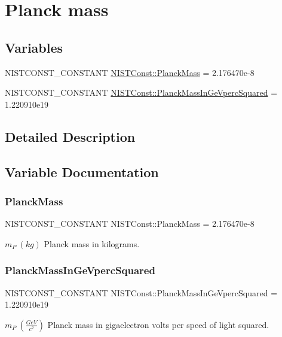 \hypertarget{group___n_i_s_t_const-_planck_mass}{}\section{Planck mass}
\label{group___n_i_s_t_const-_planck_mass}
\subsection*{Variables}
\begin{DoxyCompactItemize}
\item 
N\+I\+S\+T\+C\+O\+N\+S\+T\+\_\+\+C\+O\+N\+S\+T\+A\+NT \mbox{\hyperlink{group___n_i_s_t_const-_planck_mass_gaa7617a5b3ffb40b1ab6b80ae4017fe47}{N\+I\+S\+T\+Const\+::\+Planck\+Mass}} = 2.\+176470e-\/8
\item 
N\+I\+S\+T\+C\+O\+N\+S\+T\+\_\+\+C\+O\+N\+S\+T\+A\+NT \mbox{\hyperlink{group___n_i_s_t_const-_planck_mass_ga8d336f9833239f0cce753a1912e0a6df}{N\+I\+S\+T\+Const\+::\+Planck\+Mass\+In\+Ge\+Vperc\+Squared}} = 1.\+220910e19
\end{DoxyCompactItemize}


\subsection{Detailed Description}


\subsection{Variable Documentation}
\mbox{\label{group___n_i_s_t_const-_planck_mass_gaa7617a5b3ffb40b1ab6b80ae4017fe47}} 
\subsubsection{\texorpdfstring{Planck\+Mass}{PlanckMass}}
{\footnotesize\ttfamily N\+I\+S\+T\+C\+O\+N\+S\+T\+\_\+\+C\+O\+N\+S\+T\+A\+NT N\+I\+S\+T\+Const\+::\+Planck\+Mass = 2.\+176470e-\/8}

$m_P \ (kg)$ Planck mass in kilograms. \mbox{\label{group___n_i_s_t_const-_planck_mass_ga8d336f9833239f0cce753a1912e0a6df}} 
\subsubsection{\texorpdfstring{Planck\+Mass\+In\+Ge\+Vperc\+Squared}{PlanckMassInGeVpercSquared}}
{\footnotesize\ttfamily N\+I\+S\+T\+C\+O\+N\+S\+T\+\_\+\+C\+O\+N\+S\+T\+A\+NT N\+I\+S\+T\+Const\+::\+Planck\+Mass\+In\+Ge\+Vperc\+Squared = 1.\+220910e19}

$m_P \ (\frac{GeV}{c^2})$ Planck mass in gigaelectron volts per speed of light squared. 